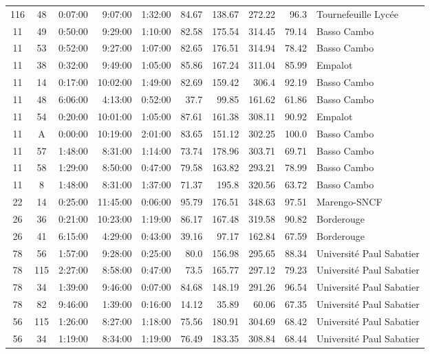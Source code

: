 \documentclass[twoside,12pt]{article}
\begin{document}
\begin{footnotesize}
\begin{longtable}{|c|c|r|r|r|r|r|r|r|l|}
	116	&	48	&	0:07:00	&	9:07:00	&	1:32:00	&	84.67	&	138.67	&	272.22	&	96.3	&	Tournefeuille Lycée	\\
	11	&	49	&	0:50:00	&	9:29:00	&	1:10:00	&	82.58	&	175.54	&	314.45	&	79.14	&	Basso Cambo	\\
	11	&	53	&	0:52:00	&	9:27:00	&	1:07:00	&	82.65	&	176.51	&	314.94	&	78.42	&	Basso Cambo	\\
	11	&	38	&	0:32:00	&	9:49:00	&	1:05:00	&	85.86	&	167.24	&	311.04	&	85.99	&	Empalot	\\
	11	&	14	&	0:17:00	&	10:02:00	&	1:49:00	&	82.69	&	159.42	&	306.4	&	92.19	&	Basso Cambo	\\
	11	&	48	&	6:06:00	&	4:13:00	&	0:52:00	&	37.7	&	99.85	&	161.62	&	61.86	&	Basso Cambo	\\
	11	&	54	&	0:20:00	&	10:01:00	&	1:05:00	&	87.61	&	161.38	&	308.11	&	90.92	&	Empalot	\\
	11	&	A	&	0:00:00	&	10:19:00	&	2:01:00	&	83.65	&	151.12	&	302.25	&	100.0	&	Basso Cambo	\\
	11	&	57	&	1:48:00	&	8:31:00	&	1:14:00	&	73.74	&	178.96	&	303.71	&	69.71	&	Basso Cambo	\\
	11	&	58	&	1:29:00	&	8:50:00	&	0:47:00	&	79.58	&	163.82	&	293.21	&	78.99	&	Basso Cambo	\\
	11	&	8	&	1:48:00	&	8:31:00	&	1:37:00	&	71.37	&	195.8	&	320.56	&	63.72	&	Basso Cambo	\\
	22	&	14	&	0:25:00	&	11:45:00	&	0:06:00	&	95.79	&	176.51	&	348.63	&	97.51	&	Marengo-SNCF	\\
	26	&	36	&	0:21:00	&	10:23:00	&	1:19:00	&	86.17	&	167.48	&	319.58	&	90.82	&	Borderouge	\\
	26	&	41	&	6:15:00	&	4:29:00	&	0:43:00	&	39.16	&	97.17	&	162.84	&	67.59	&	Borderouge	\\
	78	&	56	&	1:57:00	&	9:28:00	&	0:25:00	&	80.0	&	156.98	&	295.65	&	88.34	&	Université Paul Sabatier	\\
	78	&	115	&	2:27:00	&	8:58:00	&	0:47:00	&	73.5	&	165.77	&	297.12	&	79.23	&	Université Paul Sabatier	\\
	78	&	34	&	1:39:00	&	9:46:00	&	0:07:00	&	84.68	&	148.19	&	291.26	&	96.54	&	Université Paul Sabatier	\\
	78	&	82	&	9:46:00	&	1:39:00	&	0:16:00	&	14.12	&	35.89	&	60.06	&	67.35	&	Université Paul Sabatier	\\
	56	&	115	&	1:26:00	&	8:27:00	&	1:18:00	&	75.56	&	180.91	&	304.69	&	68.42	&	Université Paul Sabatier	\\
	56	&	34	&	1:19:00	&	8:34:00	&	1:19:00	&	76.49	&	183.35	&	308.84	&	68.44	&	Université Paul Sabatier	\\

\end{longtable}
\end{footnotesize}
\end{document}
